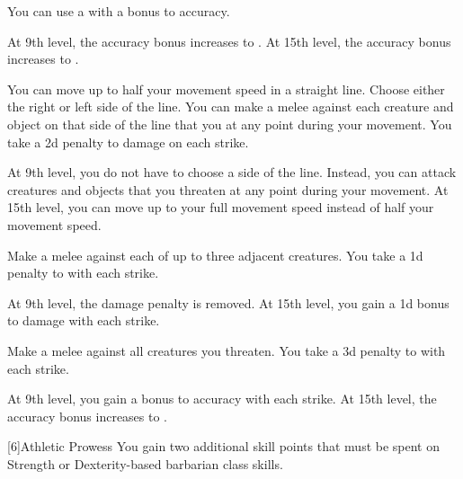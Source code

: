 {                 You can use a  with a  bonus to accuracy.

                At 9th level, the accuracy bonus increases to .
                At 15th level, the accuracy bonus increases to .

                 You can move up to half your movement speed in a straight line.
                Choose either the right or left side of the line.
                You can make a melee  against each creature and object on that side of the line that you  at any point during your movement.
                You take a \minus2d penalty to damage on each strike.

                At 9th level, you do not have to choose a side of the line.
                Instead, you can attack creatures and objects that you threaten at any point during your movement.
                At 15th level, you can move up to your full movement speed instead of half your movement speed.

                 Make a melee  against each of up to three adjacent creatures.
                You take a \minus1d penalty to  with each strike.

                At 9th level, the damage penalty is removed.
                At 15th level, you gain a \plus1d bonus to damage with each strike.

                 Make a melee  against all creatures you threaten.
                You take a \minus3d penalty to  with each strike.

                At 9th level, you gain a  bonus to accuracy with each strike.
                At 15th level, the accuracy bonus increases to .
            }

            [6]{Athletic Prowess} You gain two additional skill points that must be spent on Strength or Dexterity-based barbarian class skills.


